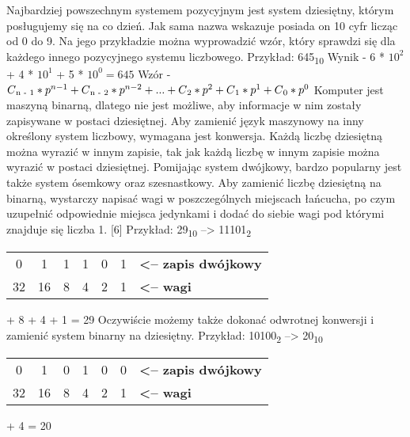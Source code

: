\documentclass[12pt, a4paper, onside, polish]{article}				%
\begin{document}
\vspace{10mm}
Najbardziej powszechnym systemem pozycyjnym jest system dziesiętny, którym posługujemy się na co dzień. Jak sama nazwa wskazuje posiada on 10 cyfr licząc od 0 do 9. Na jego przykładzie można wyprowadzić wzór, który sprawdzi się dla każdego innego pozycyjnego systemu liczbowego.
\vspace{5mm}
\newline
Przykład: {645\textsubscript{10}}
\vspace{5mm}
\newline
Wynik - 6 * $10^{2}$ + 4 * $10^{1}$ + 5 * $10^{0} = 645$
\newline
Wzór - $C\textsubscript{n - 1} * p^{n - 1} + C\textsubscript{n - 2} * p^{n - 2} + ... + C\textsubscript{2} * p^{2} + C\textsubscript{1} * p^{1} + C\textsubscript{0} * p^{0}$
\newline\newline
Komputer jest maszyną binarną, dlatego nie jest możliwe, aby informacje w nim zostały zapisywane w postaci dziesiętnej. Aby zamienić język maszynowy na inny określony system liczbowy, wymagana jest konwersja. Każdą liczbę dziesiętną można wyrazić w innym zapisie, tak jak każdą liczbę w innym zapisie można wyrazić w postaci dziesiętnej. Pomijając system dwójkowy, bardzo popularny jest także system ósemkowy oraz szesnastkowy. Aby zamienić liczbę dziesiętną na binarną, wystarczy napisać wagi w poszczególnych miejscach łańcucha, po czym uzupełnić odpowiednie miejsca jedynkami i dodać do siebie wagi pod którymi znajduje się liczba 1. [6]
\vspace{5mm}
\newline
Przykład: 29\textsubscript{10} -->  11101\textsubscript{2}
\begin{table}[htb]
\centering
\begin{tabular}{ccccccl}
0  & 1  & 1 & 1 & 0 & 1 & \textbf{\textless{}-- zapis dwójkowy} \\ \cline{1-6}
32 & 16 & 8 & 4 & 2 & 1 & \textbf{\textless{}-- wagi}          
\end{tabular}
\end{table}
 + 8 + 4 + 1 = 29
\newline
\newline
\newline
Oczywiście możemy także dokonać odwrotnej konwersji i zamienić system binarny na dziesiętny. 
\vspace{5mm}
\newline
Przykład: 10100\textsubscript{2} -->  20\textsubscript{10}
\begin{table}[htb]
\centering
\begin{tabular}{ccccccl}
0  & 1  & 0 & 1 & 0 & 0 & \textbf{\textless{}-- zapis dwójkowy} \\ \cline{1-6}
32 & 16 & 8 & 4 & 2 & 1 & \textbf{\textless{}-- wagi}          
\end{tabular}
\end{table}
 + 4 = 20
\newline
\end{document}
